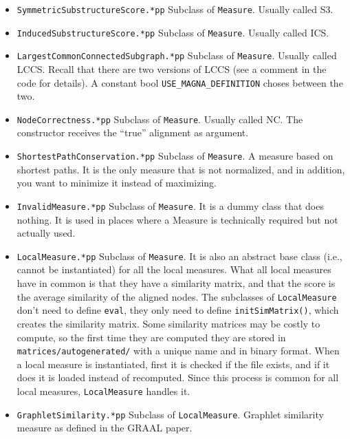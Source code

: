 \documentclass[]{article}
\begin{document}
\begin{itemize}
\item \texttt{SymmetricSubstructureScore.*pp} Subclass of \texttt{Measure}. Usually called S3.

\item \texttt{InducedSubstructureScore.*pp} Subclass of \texttt{Measure}. Usually called ICS.

\item \texttt{LargestCommonConnectedSubgraph.*pp} Subclass of \texttt{Measure}. Usually called LCCS. Recall that there are two versions of LCCS (see a comment in the code for details). A constant bool \texttt{USE\_MAGNA\_DEFINITION} choses between the two.

\item \texttt{NodeCorrectness.*pp} Subclass of \texttt{Measure}. Usually called NC. The constructor receives the ``true'' alignment as argument.

\item \texttt{ShortestPathConservation.*pp} Subclass of \texttt{Measure}. A measure based on shortest paths. It is the only measure that is not normalized, and in addition, you want to minimize it instead of maximizing.

\item \texttt{InvalidMeasure.*pp} Subclass of \texttt{Measure}. It is a dummy class that does nothing. It is used in places where a Measure is technically required but not actually used.

\item \texttt{LocalMeasure.*pp} Subclass of \texttt{Measure}. It is also an abstract base class (i.e., cannot be instantiated) for all the local measures. What all local measures have in common is that they have a similarity matrix, and that the score is the average similarity of the aligned nodes. The subclasses of \texttt{LocalMeasure} don't need to define \texttt{eval}, they only need to define \texttt{initSimMatrix()}, which creates the similarity matrix. Some similarity matrices may be costly to compute, so the first time they are computed they are stored in \texttt{matrices/autogenerated/} with a unique name and in binary format. When a local measure is instantiated, first it is checked if the file exists, and if it does it is loaded instead of recomputed. Since this process is common for all local measures, \texttt{LocalMeasure} handles it.

\item \texttt{GraphletSimilarity.*pp} Subclass of \texttt{LocalMeasure}. Graphlet similarity measure as defined in the GRAAL paper.


\end{itemize}
\end{document}
